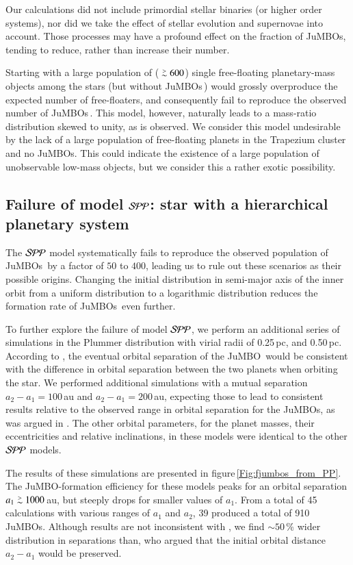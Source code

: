 \documentclass[submission,phys]{lib/SciPost}
\def\apgt{\ {\raise-.5ex\hbox{$\buildrel>\over\sim$}}\ }
\newcommand{\jumbo}{\mbox{JuMBO}}
\newcommand{\jumbos}{\mbox{JuMBOs}}
\begin{document}
Our calculations did not include primordial stellar binaries (or
higher order systems), nor did we take the effect of stellar evolution
and supernovae into account. Those processes may have a profound
effect on the fraction of \jumbos, tending to reduce, rather than
increase their number.

Starting with a large population of ($\apgt 600$) single free-floating
planetary-mass objects among the stars (but without \jumbos\,) would
grossly overproduce the expected number of free-floaters, and
consequently fail to reproduce the observed number of \jumbos\,.  This
model, however, naturally leads to a mass-ratio distribution skewed to
unity, as is observed. We consider this model undesirable by the lack
of a large population of free-floating planets in the Trapezium
cluster and no \jumbos. This could indicate the existence of a large
population of unobservable low-mass objects, but we consider this a
rather exotic possibility.

\subsection{Failure of model ${\cal SPP}$: star with a hierarchical planetary system}\label{Sect:Failure_SPP}

The ${\cal SPP}$ model systematically fails to reproduce the observed
population of \jumbos\, by a factor of $50$ to $400$, leading us to rule out
these scenarios as their possible origins. Changing the initial
distribution in semi-major axis of the inner orbit from a uniform
distribution to a logarithmic distribution reduces the formation rate
of \jumbos\, even further.

To further explore the failure of model ${\cal SPP}$, we perform an
additional series of simulations in the Plummer distribution with
virial radii of 0.25\,pc, and 0.50\,pc.  According to
\cite{2023arXiv231006016W}, the eventual orbital separation of the
\jumbo\, would be consistent with the difference in orbital separation
between the two planets when orbiting the star.  We performed
additional simulations with a mutual separation $a_2-a_1 = 100$\,au and
$a_2-a_1 = 200$\,au, expecting those to lead to consistent results relative to
the observed range in orbital separation for the
\jumbos, as was argued in \cite{2023arXiv231006016W}.  The other
orbital parameters, for the planet masses, their eccentricities and
relative inclinations, in these models were identical to the other
${\cal SPP}$ models.

The results of these simulations are presented in
figure\,\ref{Fig:fjumbos_from_PP}.  The \jumbo-formation efficiency
for these models peaks for an orbital separation $a_1 \apgt 1000$\,au,
but steeply drops for smaller values of $a_1$.  From a total of 45
calculations with various ranges of $a_1$ and $a_2$, 39 produced a
total of 910 \jumbos.  Although results are not inconsistent with
\cite{2023arXiv231006016W}, we find $\sim 50$\,\% wider distribution
in separations than\cite{2023arXiv231006016W}, who argued that the
initial orbital distance $a_2-a_1$ would be preserved.
\end{document}
